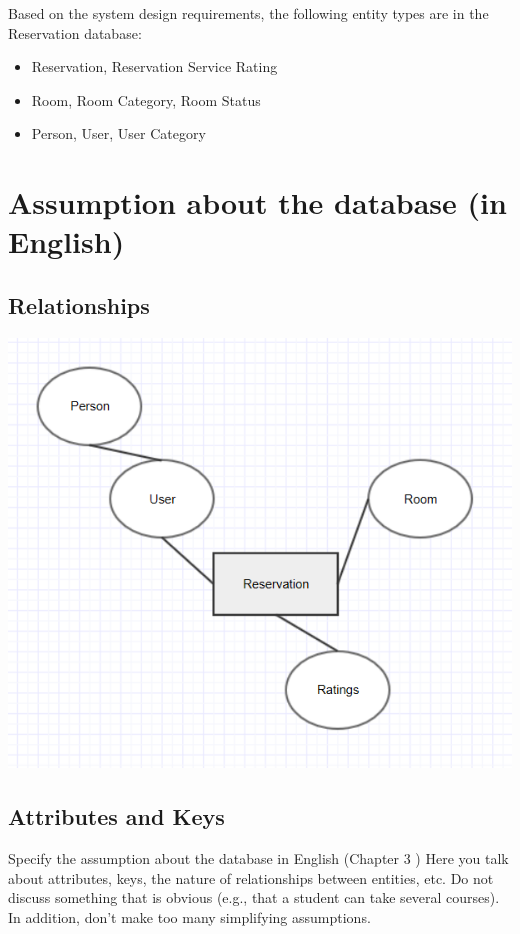 \documentclass[11pt]{report}
\begin{document}
Based on the system design requirements, the following entity types are in the Reservation database:
\begin{itemize}
    \item Reservation,  Reservation Service Rating
    \item Room, Room Category, Room Status
    \item Person, User, User Category
\end{itemize}

\section*{Assumption about the database (in English)}
\subsection*{Relationships}
\begin{center}
\includegraphics{reservation_conceptual.PNG}
\end{center}

\subsection*{Attributes and Keys}

Specify the assumption about the database in English 
(Chapter 3
) 
Here you talk about attributes,
 keys, the nature of relationships between entities, etc. Do not 
discuss something that is obvious (e.g.,
 that a student can take several courses). In addition,
don't make too many simplifying assumptions.
\end{document}
